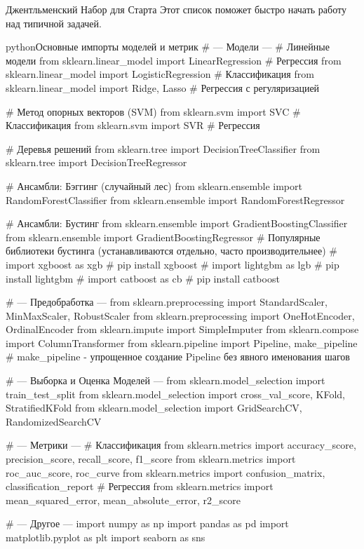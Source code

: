 \begin{myblock}{Джентльменский Набор для Старта}
    Этот список поможет быстро начать работу над типичной задачей.
\end{myblock}
\begin{codebox}{python}{Основные импорты моделей и метрик}
# --- Модели ---
# Линейные модели
from sklearn.linear_model import LinearRegression # Регрессия
from sklearn.linear_model import LogisticRegression # Классификация
from sklearn.linear_model import Ridge, Lasso # Регрессия с регуляризацией

# Метод опорных векторов (SVM)
from sklearn.svm import SVC # Классификация
from sklearn.svm import SVR # Регрессия

# Деревья решений
from sklearn.tree import DecisionTreeClassifier
from sklearn.tree import DecisionTreeRegressor

# Ансамбли: Бэггинг (случайный лес)
from sklearn.ensemble import RandomForestClassifier
from sklearn.ensemble import RandomForestRegressor

# Ансамбли: Бустинг
from sklearn.ensemble import GradientBoostingClassifier
from sklearn.ensemble import GradientBoostingRegressor
# Популярные библиотеки бустинга (устанавливаются отдельно, часто производительнее)
# import xgboost as xgb # pip install xgboost
# import lightgbm as lgb # pip install lightgbm
# import catboost as cb # pip install catboost

# --- Предобработка ---
from sklearn.preprocessing import StandardScaler, MinMaxScaler, RobustScaler
from sklearn.preprocessing import OneHotEncoder, OrdinalEncoder
from sklearn.impute import SimpleImputer
from sklearn.compose import ColumnTransformer
from sklearn.pipeline import Pipeline, make_pipeline # make_pipeline - упрощенное создание Pipeline без явного именования шагов

# --- Выборка и Оценка Моделей ---
from sklearn.model_selection import train_test_split
from sklearn.model_selection import cross_val_score, KFold, StratifiedKFold
from sklearn.model_selection import GridSearchCV, RandomizedSearchCV

# --- Метрики ---
# Классификация
from sklearn.metrics import accuracy_score, precision_score, recall_score, f1_score
from sklearn.metrics import roc_auc_score, roc_curve
from sklearn.metrics import confusion_matrix, classification_report
# Регрессия
from sklearn.metrics import mean_squared_error, mean_absolute_error, r2_score

# --- Другое ---
import numpy as np
import pandas as pd
import matplotlib.pyplot as plt
import seaborn as sns
\end{codebox}


